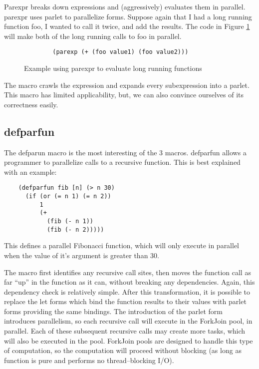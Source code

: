 \documentclass{sig-alternate}
\begin{document}
Parexpr breaks down expressions and (aggressively) evaluates them in parallel.
parexpr uses parlet to parallelize forms.
Suppose again that I had a long running function foo, I wanted to call it twice, and add the results.
The code in Figure \ref{fig:parexpr} will make both of the long running calls to foo in parallel.

\begin{figure}[h]
    \begin{verbatim}
        (parexp (+ (foo value1) (foo value2)))
    \end{verbatim}
    \caption{Example using parexpr to evaluate long running functions}
    \label{fig:parexpr}
\end{figure}

The macro crawls the expression and expands every subexpression into a parlet.
This macro has limited applicability, but, we can also convince ourselves of its correctness easily.

\subsection{defparfun}

The defparun macro is the most interesting of the 3 macros.
defparfun allows a programmer to parallelize calls to a recursive function.
This is best explained with an example:

\begin{verbatim}
    (defparfun fib [n] (> n 30)
      (if (or (= n 1) (= n 2))
          1
          (+
            (fib (- n 1))
            (fib (- n 2)))))
\end{verbatim}

This defines a parallel Fibonacci function, which will only execute in parallel when the value of it's argument is greater than 30.

The macro first identifies any recursive call sites, then moves the function call as far ``up'' in the function as it can, without breaking any dependencies.
Again, this dependency check is relatively simple.
After this transformation, it is possible to replace the let forms which bind the function results to their values with parlet forms providing the same bindings.
The introduction of the parlet form introduces parallelism, so each recursive call will execute in the ForkJoin pool, in parallel.
Each of these subsequent recursive calls may create more tasks, which will also be executed in the pool.
ForkJoin pools are designed to handle this type of computation, so the computation will proceed without blocking (as long as function is pure and performs no thread--blocking I/O).
\end{document}
